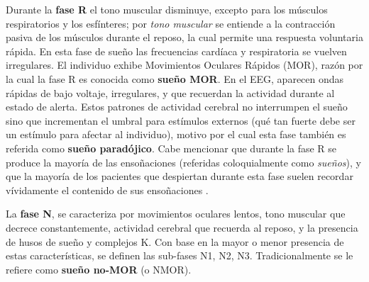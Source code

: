 \documentclass[12pt,letterpaper]{book}
\begin{document}
Durante la \textbf{fase R} el tono muscular disminuye, excepto para los músculos respiratorios y 
los esfínteres;
%
por \textit{tono muscular} se entiende a la contracción pasiva de los músculos durante el reposo, la cual permite una respuesta voluntaria rápida.
%
En esta fase de sueño las frecuencias cardíaca y respiratoria se vuelven irregulares. 
%
El individuo exhibe Movimientos Oculares Rápidos (MOR), razón por la cual la fase R es conocida como \textbf{sueño MOR}.
%
En el EEG, aparecen ondas rápidas de bajo voltaje, irregulares, y que recuerdan la actividad durante al estado de alerta. 
%
Estos patrones de actividad cerebral no interrumpen el sueño sino que incrementan el umbral para estímulos externos (qué tan fuerte debe ser un estímulo para afectar al individuo), motivo por el cual esta fase también es referida como \textbf{sueño paradójico}.
%
Cabe mencionar que durante la fase R se produce la mayoría de las ensoñaciones (referidas coloquialmente como \textit{sueños}), y que la mayoría de los pacientes que despiertan durante esta fase suelen recordar vívidamente el contenido de sus ensoñaciones \cite{Rosales14}.

La \textbf{fase N}, se caracteriza por movimientos oculares lentos, tono muscular que decrece constantemente, actividad cerebral que recuerda al reposo, y la presencia de husos de sueño y complejos K. 
%
Con base en la mayor o menor presencia de estas características, se definen las sub-fases N1, N2, N3.
%
Tradicionalmente se le refiere como \textbf{sueño no-MOR} (o NMOR).
\end{document}
